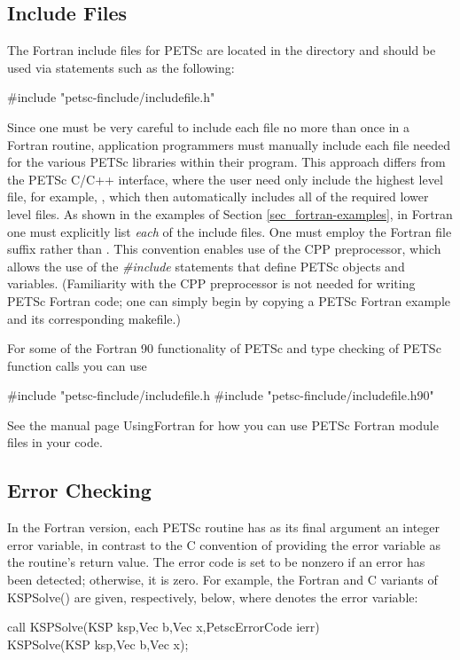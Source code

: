 \subsection{Include Files}
\label{sec_fortran_includes}

The Fortran include files for PETSc are located in the directory
 and should be used via statements
such as the following:
\begin{tabbing}
    \#include "petsc-finclude/includefile.h"
\end{tabbing}
Since one must be very careful to include each file no more than once
in a Fortran routine, application programmers must manually include
each file needed for the various PETSc libraries within their
program.  This approach differs from the PETSc C/C++ interface, where
the user need only include the highest level file, for example, , which then automatically includes all of the required lower
level files.  As shown in the examples of Section
\ref{sec_fortran-examples}, in Fortran one must explicitly list {\em
each} of the include files. One must employ
the Fortran file suffix 
rather than .  This convention enables use of the CPP
preprocessor, which allows the use of the {\em \#include} statements
that define PETSc objects and variables. (Familiarity with the CPP
preprocessor is not needed for writing PETSc Fortran code; one can simply
begin by copying a PETSc Fortran example and its corresponding
makefile.)

For some of the Fortran 90 functionality of PETSc and type checking
of PETSc function calls you can use
\begin{tabbing}
    \#include "petsc-finclude/includefile.h
    \#include "petsc-finclude/includefile.h90"
\end{tabbing}
See the manual page UsingFortran for how you can use PETSc Fortran
module files in your code.

\subsection{Error Checking}
\label{sec_fortran_errors}

In the Fortran version, each PETSc routine has as its final argument
an integer error variable, in contrast to the C convention of
providing the error variable as the routine's return value.  The error
code is set to be nonzero if an error has been detected; otherwise, it
is zero.  For example, the Fortran and C variants of KSPSolve() are
given, respectively, below, where  denotes the error variable:
\begin{tabbing}
   call KSPSolve(KSP ksp,Vec b,Vec x,PetscErrorCode ierr)\\
  KSPSolve(KSP ksp,Vec b,Vec x);
\end{tabbing}

